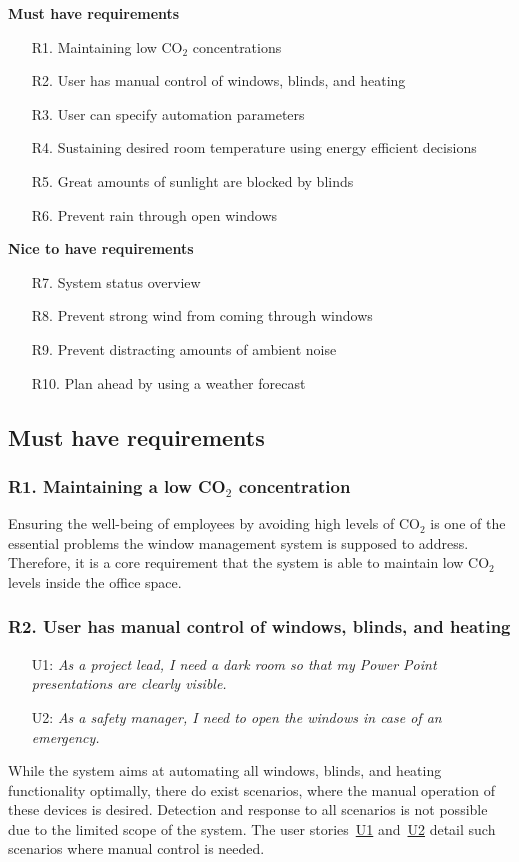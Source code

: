 \documentclass[runningheads]{llncs}
\begin{document}
\begin{description}
\item{\textbf{Must have requirements}}\
\begin{itemize}
    \item [R1.] Maintaining low CO$_2$ concentrations
    \item [R2.] User has manual control of windows, blinds, and heating
    \item [R3.] User can specify automation parameters
    \item [R4.] Sustaining desired room temperature using energy efficient decisions
    \item [R5.] Great amounts of sunlight are blocked by blinds
    \item [R6.] Prevent rain through open windows
\end{itemize}
\item{\textbf{Nice to have requirements}}\
\begin{itemize}
    \item [R7.] System status overview 
    \item [R8.] Prevent strong wind from coming through windows 
    \item [R9.] Prevent distracting amounts of ambient noise
    \item [R10.] Plan ahead by using a weather forecast 
\end{itemize}
\end{description}
\subsection{Must have requirements}
\subsubsection{R1. Maintaining a low CO$_2$ concentration}\label{r1}

Ensuring the well-being of employees by avoiding high levels of CO$_2$ is one of the essential problems the window management system is supposed to address. Therefore, it is a core requirement that the system is able to maintain low CO$_2$ levels inside the office space.

\subsubsection{R2. User has manual control of windows, blinds, and heating}\label{r2}
\begin{itemize}
    \item [U1:] \label{r2u1} \textit{As a project lead, I need a dark room so that my Power Point presentations are clearly visible.}
    \item [U2:] \label{r2u2} \textit{As a safety manager, I need to open the windows in case of an emergency.}
\end{itemize}
While the system aims at automating all windows, blinds, and heating functionality optimally, there do exist scenarios, where the manual operation of these devices is desired. Detection and response to all scenarios is not possible due to the limited scope of the system. The user stories~\hyperref[r2u1]{U1} and~\hyperref[r2u1]{U2} detail such scenarios where manual control is needed. 
\end{document}
